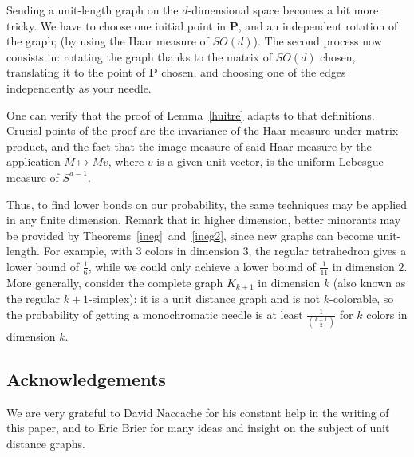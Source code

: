 \documentclass[a4paper,11pt]{article}
\theoremstyle{definition}
\theoremstyle{remark}
\begin{document}
Sending a unit-length graph on the $d$-dimensional space becomes a bit more 
tricky. We have to choose one initial point in $ \mathbf{P} $, and an independent 
rotation of the graph; (by using the Haar measure of $SO(d)$). The second process now consists 
in: rotating the graph thanks to the matrix of $SO(d)$ chosen, translating it 
to the point of $\mathbf{P}$ chosen, and choosing one of the 
edges independently as your needle.

One can verify that the proof of Lemma~\ref{huitre} adapts to that definitions. 
Crucial 
points of the proof are the invariance of the Haar measure under matrix product, and the 
fact that the image measure of said Haar measure by the application 
$M\mapsto Mv$, where $v$ is a given unit vector, is the uniform Lebesgue 
measure of $S^{d-1}$.

Thus, to find lower bonds on our probability, the same techniques may be applied 
in any finite dimension.
%
Remark that in higher dimension, better minorants may be provided by 
Theorems~\ref{ineg}~and~\ref{ineg2}, since new graphs can 
become unit-length. For example, with $3$ colors in dimension $3$, the regular 
tetrahedron gives a lower bound 
of $\frac 1 6$, while we could only achieve a lower bound of $\frac 1 {11}$ in dimension $2$. More generally, consider the complete graph 
$K_{k+1}$ in dimension $k$ (also known as the regular $k+1$-simplex): it is a unit distance graph and is not $k$-colorable, so the 
probability of getting a monochromatic needle is at least $\frac{1}{\binom{k+1}{2}}$ 
for $k$ colors in dimension $k$.

\subsection*{Acknowledgements}
We are very grateful to David Naccache for his constant help in the writing of
this paper, and to Eric Brier for many ideas and insight on the subject of 
unit distance graphs.



\end{document}
